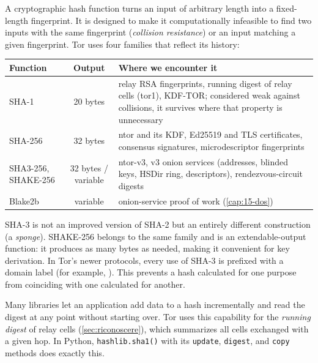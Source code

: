 A cryptographic hash function turns an input of arbitrary length into a fixed-length fingerprint. It is designed to make it computationally infeasible to find two inputs with the same fingerprint (\emph{collision resistance}) or an input matching a given fingerprint. Tor uses four families that reflect its history:
\begin{center}\small
\begin{tabularx}{\textwidth}{@{}l c >{\raggedright\arraybackslash}X@{}}
\toprule
Function & Output & Where we encounter it \\
\midrule
SHA-1 & 20 bytes & relay RSA fingerprints, running digest of relay cells (tor1), KDF-TOR; considered weak against collisions, it survives where that property is unnecessary \\
SHA-256 & 32 bytes & ntor and its KDF, Ed25519 and TLS certificates, consensus signatures, microdescriptor fingerprints \\
SHA3-256, SHAKE-256 & 32 bytes / variable & ntor-v3, v3 onion services (addresses, blinded keys, HSDir ring, descriptors), rendezvous-circuit digests \\
Blake2b & variable & onion-service proof of work (\cref{cap:15-dos}) \\
\bottomrule
\end{tabularx}
\end{center}

SHA-3 is not an improved version of SHA-2 but an entirely different construction (a \emph{sponge}). SHAKE-256 belongs to the same family and is an extendable-output function: it produces as many bytes as needed, making it convenient for key derivation. In Tor's newer protocols, every use of SHA-3 is prefixed with a domain label (for example, ). This prevents a hash calculated for one purpose from coinciding with one calculated for another.

\begin{approfondimento}
Many libraries let an application add data to a hash incrementally and read the digest at any point without starting over. Tor uses this capability for the \emph{running digest} of relay cells (\cref{sec:riconoscere}), which summarizes all cells exchanged with a given hop. In Python, \texttt{hashlib.sha1()} with its \texttt{update}, \texttt{digest}, and \texttt{copy} methods does exactly this.
\end{approfondimento}

